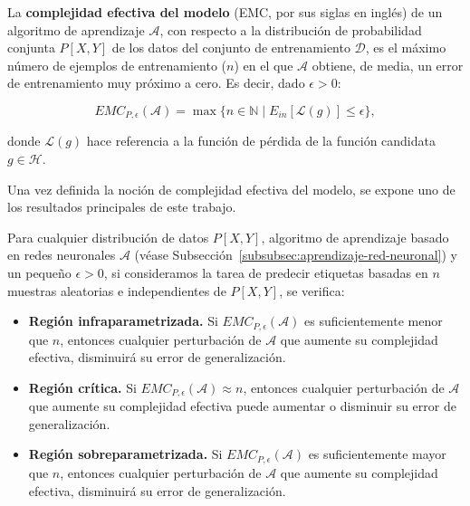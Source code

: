 \begin{definicion}
    La \textbf{complejidad efectiva del modelo} (EMC, por sus siglas en inglés) de un algoritmo de aprendizaje $\mathcal{A}$, con respecto a la distribución de probabilidad conjunta $P[X, Y]$ de los datos del conjunto de entrenamiento $\mathcal{D}$, es el máximo número de ejemplos de entrenamiento ($n$) en el que $\mathcal{A}$ obtiene, de media, un error de entrenamiento muy próximo a cero. Es decir, dado $\epsilon > 0$:

    \[
        EMC_{P, \epsilon}(\mathcal{A}) = \max\{ n \in \mathbb{N} \; | \; E_{in}[\mathcal{L}(g)] \leq \epsilon \},
    \]  

    donde $\mathcal{L}(g)$ hace referencia a la función de pérdida de la función candidata $g \in \mathcal{H}$.
\end{definicion}

Una vez definida la noción de complejidad efectiva del modelo, se expone uno de los resultados principales de este trabajo.

\begin{hipotesis}\label{hipotesis-general-double-descent}
    Para cualquier distribución de datos $P[X, Y]$, algoritmo de aprendizaje basado en redes neuronales $\mathcal{A}$ (véase Subsección~\ref{subsubsec:aprendizaje-red-neuronal}) y un pequeño $\epsilon > 0$, si consideramos la tarea de predecir etiquetas basadas en $n$ muestras aleatorias e independientes de $P[X, Y]$, se verifica:

    \begin{itemize}
        \item \textbf{Región infraparametrizada.} Si $EMC_{P, \epsilon}(\mathcal{A})$ es suficientemente menor que $n$, entonces cualquier perturbación de $\mathcal{A}$ que aumente su complejidad efectiva, disminuirá su error de generalización.
        \item \textbf{Región crítica.} Si $EMC_{P, \epsilon}(\mathcal{A}) \approx n$, entonces cualquier perturbación de $\mathcal{A}$ que aumente su complejidad efectiva puede aumentar o disminuir su error de generalización.
        \item \textbf{Región sobreparametrizada.} Si $EMC_{P, \epsilon}(\mathcal{A})$ es suficientemente mayor que $n$, entonces cualquier perturbación de $\mathcal{A}$ que aumente su complejidad efectiva, disminuirá su error de generalización.
    \end{itemize}
\end{hipotesis}


